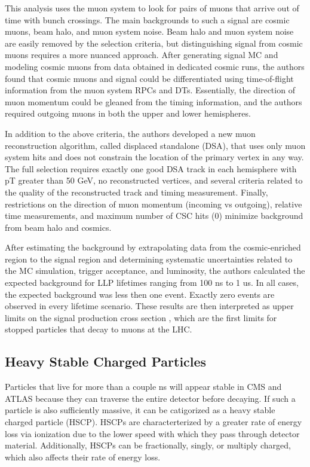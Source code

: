 \documentclass[12pt]{article}
\begin{document}
    This analysis uses the muon system to look for pairs of muons that arrive out of time with bunch crossings. The main backgrounds to such a signal are cosmic muons, beam halo, and muon system noise. Beam halo and muon system noise are easily removed by the selection criteria, but distinguishing signal from cosmic muons requires a more nuanced approach. After generating signal MC and modeling cosmic muons from data obtained in dedicated cosmic runs, the authors found that cosmic muons and signal could be differentiated using time-of-flight information from the muon system RPCs and DTs. Essentially, the direction of muon momentum could be gleaned from the timing information, and the authors required outgoing muons in both the upper and lower hemispheres.  
    
    In addition to the above criteria, the authors developed a new muon reconstruction algorithm, called displaced standalone (DSA), that uses only muon system hits and does not constrain the location of the primary vertex in any way. The full selection requires exactly one good DSA track in each hemisphere with pT greater than 50 GeV, no reconstructed vertices, and several criteria related to the quality of the reconstructed track and timing measurement. Finally, restrictions on the direction of muon momentum (incoming vs outgoing), relative time measurements, and maximum number of CSC hits (0) minimize background from beam halo and cosmics.

    After estimating the background by extrapolating data from the cosmic-enriched region to the signal region and determining systematic uncertainties related to the MC simulation, trigger acceptance, and luminosity, the authors calculated the expected background for LLP lifetimes ranging from 100 ns to 1 us. In all cases, the expected background was less then one event. Exactly zero events are observed in every lifetime scenario. These results are then interpreted as upper limits on the signal production cross section , which are the first limits for stopped particles that decay to muons at the LHC.

\subsection{Heavy Stable Charged Particles}
    Particles that live for more than a couple ns  will appear stable in CMS and ATLAS because they can traverse the entire detector before decaying. If such a particle is also sufficiently massive, it can be catigorized as a heavy stable charged particle (HSCP). HSCPs are characterterized by a greater rate of energy loss via ionization due to the lower speed with which they pass through detector material. Additionally, HSCPs can be fractionally, singly, or multiply charged, which also affects their rate of energy loss. 
\end{document}
